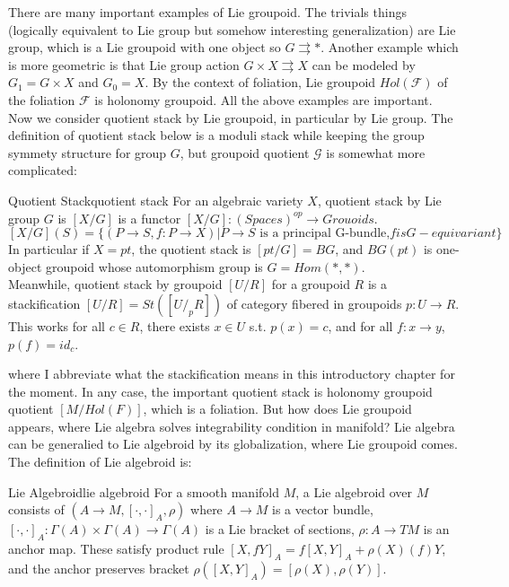 \documentclass{article}
\begin{document}
There are many important examples of Lie groupoid. The trivials things 
(logically equivalent to Lie group but somehow interesting generalization) are Lie group,
which is a Lie groupoid with one object so $G\rightrightarrows *$.
Another example which is more geometric is that Lie group action $G\times X\rightrightarrows X$ can be modeled by $G_1=G\times X$ and $G_0 = X$.
By the context of foliation, Lie groupoid $Hol(\mathcal{F})$ of the foliation $\mathcal{F}$ is holonomy groupoid. 
All the above examples are important. Now we consider quotient stack by Lie groupoid, in particular by Lie group.
The definition of quotient stack below is a moduli stack while keeping the group symmety structure for group $G$,
but groupoid quotient $\mathcal{G}$ is somewhat more complicated:


\begin{definition}{Quotient Stack}{quotient stack}
For an algebraic variety $X$, quotient stack by Lie group $G$ is $[X/G]$ is a functor $[X/G]:(Spaces)^{op}\to Grouoids$.
\[
[X/G](S) = \{ (P\to S, f:P\to X) |  P\to S \text{ is a principal G-bundle,} f is G-equivariant \}
\]
In particular if $X=pt$, the quotient stack is $[pt/G] = BG$, 
and $BG(pt)$ is one-object groupoid whose automorphism group is $G = Hom(*,*)$. \\

Meanwhile, quotient stack by groupoid $[U/R]$ for a groupoid $R$ is a stackification $[U/R] = St([U/_p R])$ of 
category fibered in groupoids $p: U \to R$. This works for all $c\in R$, there exists $x\in U$ s.t. $p(x)=c$,
and for all $f:x\to y$, $p(f) = id_c$.
\end{definition}

where I abbreviate what the stackification means in this introductory chapter for the moment.
In any case, the important quotient stack is holonomy groupoid quotient $[M/Hol(F)]$, which is a foliation.
But how does Lie groupoid appears, where Lie algebra solves integrability condition in manifold?
Lie algebra can be generalied to Lie algebroid by its globalization, where Lie groupoid comes.
The definition of Lie algebroid is:


\begin{definition}{Lie Algebroid}{lie algebroid}
For a smooth manifold $M$, a Lie algebroid over $M$ consists of $(A\to M,[\cdot,\cdot]_A, \rho)$
where $A\to M$ is a vector bundle, $[\cdot, \cdot]_A : \Gamma(A) \times \Gamma(A)\to \Gamma(A)$ is a Lie bracket of sections,
$\rho:A \to TM$ is an anchor map. These satisfy product rule $[X,fY]_A = f[X,Y]_A + \rho(X)(f) Y$,
and the anchor preserves bracket $\rho([X,Y]_A) = [\rho(X), \rho (Y)]$.
\end{definition}
\end{document}
